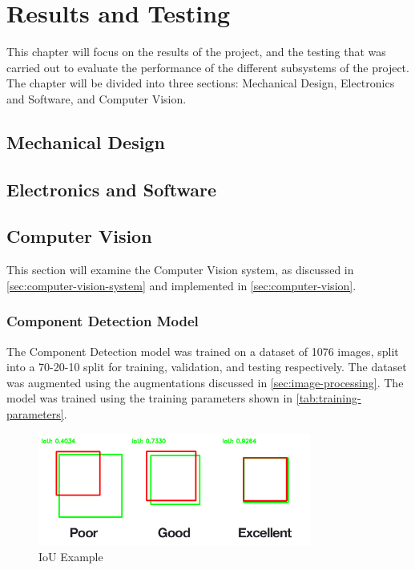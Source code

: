 \section{Results and Testing}
\label{sec:results-and-testing}
This chapter will focus on the results of the project, and the testing that was carried out to evaluate the performance of the different subsystems of the project. The chapter will be divided into three sections: Mechanical Design, Electronics and Software, and Computer Vision.

\subsection{Mechanical Design}
\label{sec:mechanical-design-evaluation}

\subsection{Electronics and Software}
\label{sec:electronics-and-software-evaluation}

\subsection{Computer Vision}
\label{sec:computer-vision-evaluation}
This section will examine the Computer Vision system, as discussed in \autoref{sec:computer-vision-system} and implemented in \autoref{sec:computer-vision}.

\subsubsection{Component Detection Model}
The Component Detection model was trained on a dataset of 1076 images, split into a 70-20-10 split for training, validation, and testing respectively. The dataset was augmented using the augmentations discussed in \autoref{sec:image-processing}. The model was trained using the training parameters shown in \autoref{tab:training-parameters}.

\begin{figure}[H]
    \centering
    \includegraphics[width=0.8\textwidth]{imgs/articles/iou.png}
    \caption{IoU Example \cite{rosebrock_2016}}
    \label{fig:iou}
  \end{figure}
  
